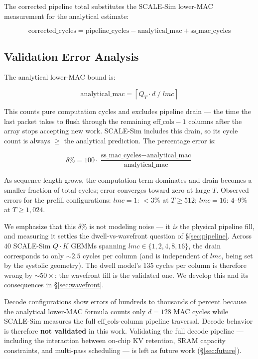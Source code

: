 \documentclass[11pt]{article}
\begin{document}
The corrected pipeline total substitutes the SCALE-Sim lower-MAC
measurement for the analytical estimate:

\[
\text{corrected\_cycles}
= \text{pipeline\_cycles} - \text{analytical\_mac} + \text{ss\_mac\_cycles}
\]

\subsection{Validation Error Analysis}

The analytical lower-MAC bound is:

\[
\text{analytical\_mac} = \left\lceil Q_T \cdot d \;/\; lmc \right\rceil
\]

This counts pure computation cycles and excludes pipeline drain ---
the time the last packet takes to flush through the remaining
\(\text{eff\_cols} - 1\) columns after the array stops accepting
new work.
SCALE-Sim includes this drain, so its cycle count is always
\(\geq\) the analytical prediction.
The percentage error is:

\[
\delta\% = 100 \cdot
\frac{\text{ss\_mac\_cycles} - \text{analytical\_mac}}
     {\text{analytical\_mac}}
\]

As sequence length grows, the computation term dominates and
drain becomes a smaller fraction of total cycles;
error converges toward zero at large \(T\).
Observed errors for the prefill configurations:
\(lmc = 1\): \(<3\%\) at \(T \geq 512\);
\(lmc = 16\): \(4\)--\(9\%\) at \(T \geq 1{,}024\).

We emphasize that this \(\delta\%\) is not modeling noise --- it \emph{is} the
physical pipeline fill, and measuring it settles the dwell-vs-wavefront question
of \S\ref{sec:pipeline}. Across \(40\) SCALE-Sim \(Q\!\cdot\!K\) GEMMs spanning
\(lmc \in \{1,2,4,8,16\}\), the drain corresponds to only \(\sim\!2.5\) cycles per
column (and is independent of \(lmc\), being set by the systolic geometry). The
dwell model's \(135\) cycles per column is therefore wrong by \(\sim\!50\times\);
the wavefront fill is the validated one. We develop this and its consequences in
\S\ref{sec:wavefront}.

Decode configurations show errors of hundreds to thousands
of percent because the analytical lower-MAC formula counts only
\(d = 128\) MAC cycles while SCALE-Sim measures the full
\(\text{eff\_cols}\)-column pipeline traversal.
Decode behavior is therefore \textbf{not validated} in this work.
Validating the full decode pipeline --- including the interaction
between on-chip KV retention, SRAM capacity constraints, and
multi-pass scheduling --- is left as future work (\S\ref{sec:future}).
\end{document}

